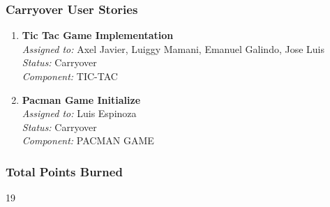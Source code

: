 \subsubsection*{Carryover User Stories}

\begin{enumerate}
    \item \textbf{Tic Tac Game Implementation} \\
    \textit{Assigned to:} Axel Javier, Luiggy Mamani, Emanuel Galindo, Jose Luis \\
    \textit{Status:} Carryover \\
    \textit{Component:} TIC-TAC
    \item \textbf{Pacman Game Initialize } \\
    \textit{Assigned to:} Luis Espinoza \\
    \textit{Status:} Carryover \\
    \textit{Component:} PACMAN GAME

\end{enumerate}

\subsubsection*{Total Points Burned}
19


